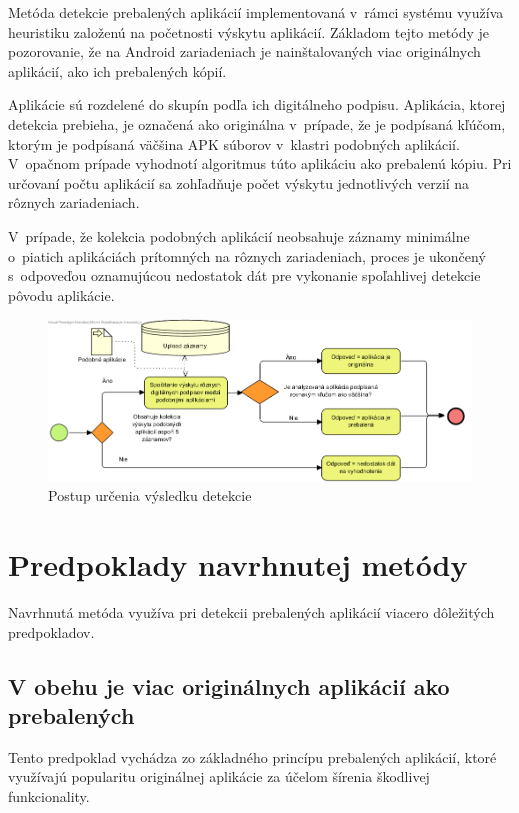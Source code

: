 Metóda detekcie prebalených aplikácií implementovaná v~rámci systému  využíva heuristiku založenú na početnosti výskytu aplikácií. Základom tejto metódy je pozorovanie, že na Android zariadeniach je nainštalovaných viac originálnych aplikácií, ako ich prebalených kópií.

Aplikácie sú rozdelené do skupín podľa ich digitálneho podpisu. Aplikácia, ktorej detekcia prebieha, je označená ako originálna v~prípade, že je podpísaná kľúčom, ktorým je podpísaná väčšina APK súborov v~klastri podobných aplikácií.  V~opačnom prípade vyhodnotí algoritmus túto aplikáciu ako prebalenú kópiu. Pri určovaní počtu aplikácií sa zohľadňuje počet výskytu jednotlivých verzií na rôznych zariadeniach. 

V~prípade, že kolekcia podobných aplikácií neobsahuje záznamy minimálne o~piatich aplikáciách prítomných na rôznych zariadeniach, proces je ukončený s~odpoveďou oznamujúcou nedostatok dát pre vykonanie spoľahlivej detekcie pôvodu aplikácie.

\begin{figure}[htb]
  \begin{center}
    \includegraphics[width=130mm]{images/detection-original.png}
  \end{center}
  \caption{Postup určenia výsledku detekcie}
  \label{fig:detectionOriginal}
\end{figure}

\section{Predpoklady navrhnutej metódy}
Navrhnutá metóda využíva pri detekcii prebalených aplikácií viacero dôležitých predpokladov.

\subsection*{V obehu je viac originálnych aplikácií ako prebalených}
Tento predpoklad vychádza zo základného princípu prebalených aplikácií, ktoré využívajú popularitu originálnej aplikácie za účelom šírenia škodlivej funkcionality.

